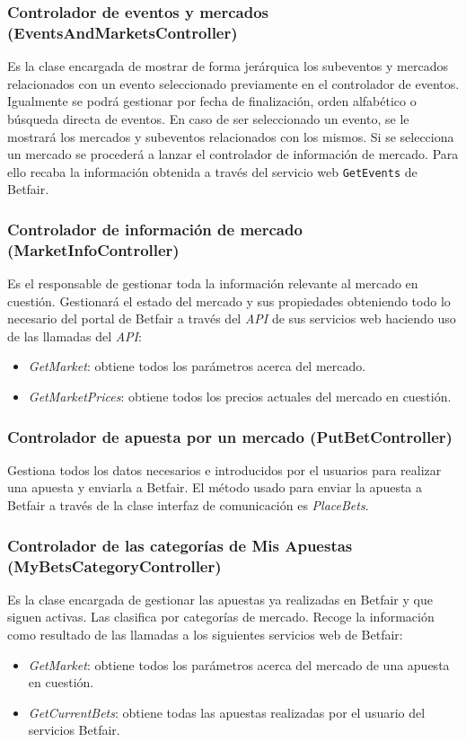 \subsubsection{Controlador de eventos y mercados (EventsAndMarketsController)}

 Es la clase encargada de mostrar de forma jerárquica los subeventos y mercados relacionados con un evento seleccionado previamente en el controlador de eventos. Igualmente se podrá gestionar por fecha de finalización, orden alfabético o búsqueda directa de eventos. En caso de ser seleccionado un evento, se le mostrará los mercados y subeventos relacionados con los mismos. Si se selecciona un mercado se procederá a lanzar el controlador de información de mercado. Para ello recaba la información obtenida a través del servicio web \lstinline{GetEvents} de Betfair.
 
\subsubsection{Controlador de información de mercado (MarketInfoController)}

 Es el responsable de gestionar toda la información relevante al mercado en cuestión. Gestionará el estado del mercado y sus propiedades obteniendo todo lo necesario del portal de Betfair a través del \emph{API} de sus servicios web haciendo uso de las llamadas del \emph{API}:
 
  \begin{itemize}
	\item \emph{GetMarket}: obtiene todos los parámetros acerca del mercado.
	\item \emph{GetMarketPrices}: obtiene todos los precios actuales del mercado en cuestión.
\end{itemize}

\subsubsection{Controlador de apuesta por un mercado (PutBetController)}
 Gestiona todos los datos necesarios e introducidos por el usuarios para realizar una apuesta y enviarla a Betfair. El método usado para enviar la apuesta a Betfair a través de la clase interfaz de comunicación es \emph{PlaceBets}.

\subsubsection{Controlador de las categorías de Mis Apuestas (MyBetsCategoryController)}
 Es la clase encargada de gestionar las apuestas ya realizadas en Betfair y que siguen activas. Las clasifica por categorías de mercado. Recoge la información como resultado de las llamadas a los siguientes servicios web de Betfair:
  \begin{itemize}
	\item \emph{GetMarket}: obtiene todos los parámetros acerca del mercado de una apuesta en cuestión.
	\item \emph{GetCurrentBets}: obtiene todas las apuestas realizadas por el usuario del servicios Betfair.
\end{itemize}
 
